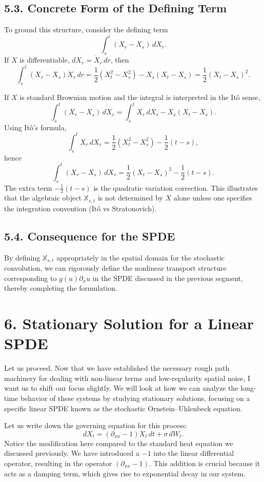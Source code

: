 \documentclass[11pt]{article}
\theoremstyle{definition}
\theoremstyle{remark}
\begin{document}
\subsection*{5.3. Concrete Form of the Defining Term}
To ground this structure, consider the defining term
\[
\int_s^t (X_r-X_s)\,dX_r.
\]
If $X$ is differentiable, $dX_r=\dot X_r\,dr$, then
\[
\int_s^t (X_r-X_s)\dot X_r\,dr
=
\frac12(X_t^2-X_s^2)-X_s(X_t-X_s)
=
\frac12(X_t-X_s)^2.
\]

If $X$ is standard Brownian motion and the integral is interpreted in the It\^o sense,
\[
\int_s^t (X_r-X_s)\,dX_r
=
\int_s^t X_r\,dX_r
-X_s(X_t-X_s).
\]
Using It\^o's formula,
\[
\int_s^t X_r\,dX_r
=
\frac12(X_t^2-X_s^2)-\frac12(t-s),
\]
hence
\[
\int_s^t (X_r-X_s)\,dX_r
=
\frac12(X_t-X_s)^2-\frac12(t-s).
\]
The extra term $-\frac12(t-s)$ is the quadratic variation correction. This illustrates that the algebraic object $\mathbb{X}_{s,t}$ is not determined by $X$ alone unless one specifies the integration convention (It\^o vs Stratonovich).

\subsection*{5.4. Consequence for the SPDE}
By defining $\mathbb{X}_{s,t}$ appropriately in the spatial domain for the stochastic convolution, we can rigorously define the nonlinear transport structure corresponding to $g(u)\partial_xu$ in the SPDE discussed in the previous segment, thereby completing the formulation.

\section*{6. Stationary Solution for a Linear SPDE}
Let us proceed. Now that we have established the necessary rough path machinery for dealing with non-linear terms and low-regularity spatial noise, I want us to shift our focus slightly. We will look at how we can analyze the long-time behavior of these systems by studying stationary solutions, focusing on a specific linear SPDE known as the stochastic Ornstein--Uhlenbeck equation.

Let us write down the governing equation for this process:
\[
dX_t=(\partial_{xx}-1)X_t\,dt+\sigma\,dW_t.
\]
Notice the modification here compared to the standard heat equation we discussed previously. We have introduced a $-1$ into the linear differential operator, resulting in the operator $(\partial_{xx}-1)$. This addition is crucial because it acts as a damping term, which gives rise to exponential decay in our system.
\end{document}
